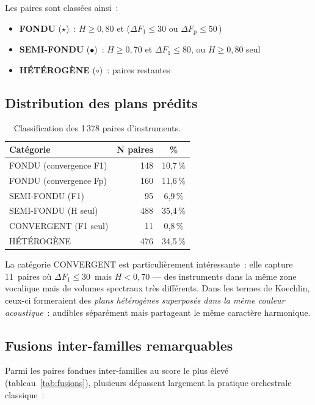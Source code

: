 \documentclass[journal]{IEEEtran}
\newcommand{\Fp}{F_\mathrm{p}}
\newcommand{\Hz}{\,\text{Hz}}
\begin{document}
Les paires sont classées ainsi~:
\begin{itemize}[nosep]
\item \textbf{FONDU} ($\star$)~: $H \geq 0{,}80$ et ($\Delta F_1 \leq 30$ ou $\Delta\Fp \leq 50$\Hz)
\item \textbf{SEMI-FONDU} ($\bullet$)~: $H \geq 0{,}70$ et $\Delta F_1 \leq 80$, ou $H \geq 0{,}80$ seul
\item \textbf{H\'ET\'EROG\`ENE} ($\circ$)~: paires restantes
\end{itemize}

\subsection{Distribution des plans prédits}

\begin{table}[!t]
\centering
\caption{Classification des 1\,378 paires d'instruments.}
\label{tab:planes}
\begin{tabular}{@{}lrc@{}}
\toprule
\textbf{Catégorie} & \textbf{N paires} & \textbf{\%} \\
\midrule
FONDU (convergence F1)      & 148 & 10{,}7\,\% \\
FONDU (convergence Fp)      & 160 & 11{,}6\,\% \\
SEMI-FONDU (F1)             &  95 &  6{,}9\,\% \\
SEMI-FONDU (H seul)         & 488 & 35{,}4\,\% \\
CONVERGENT (F1 seul)        &  11 &  0{,}8\,\% \\
HÉTÉROGÈNE                  & 476 & 34{,}5\,\% \\
\bottomrule
\end{tabular}
\end{table}

La catégorie \og CONVERGENT \fg{} est particulièrement intéressante~: elle capture 11~paires où $\Delta F_1 \leq 30$\Hz{} mais $H < 0{,}70$ --- des instruments dans la même \og zone vocalique \fg{} mais de volumes spectraux très différents. Dans les termes de Koechlin, ceux-ci formeraient des \textit{plans hétérogènes superposés dans la même couleur acoustique}~: audibles séparément mais partageant le même caractère harmonique.

\subsection{Fusions inter-familles remarquables}

Parmi les paires fondues inter-familles au score le plus élevé (tableau~\ref{tab:fusions}), plusieurs dépassent largement la pratique orchestrale classique~:
\end{document}
